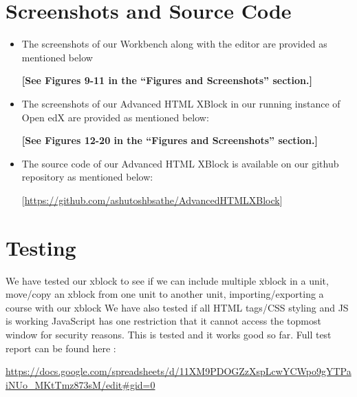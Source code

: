 \section{Screenshots and Source Code}
\begin{itemize}
\item The screenshots of our Workbench along with the editor are provided as mentioned below
\begin{center}\textbf{[See Figures 9-11 in the “Figures and Screenshots” section.]}\end{center}
\item The screenshots of our Advanced HTML XBlock in our running instance of Open edX are
provided as mentioned below:
\begin{center}\textbf{[See Figures 12-20 in the “Figures and Screenshots” section.]}\end{center}
\item The source code of our Advanced HTML XBlock is available on our github repository as
mentioned below:\newline
\begin{center}[\url{https://github.com/ashutoshbsathe/AdvancedHTMLXBlock}]\end{center}
\end{itemize}

\section{Testing} 
We have tested our xblock to see if we can include multiple xblock in a unit, move/copy an xblock from one unit to another unit, importing/exporting a course with our xblock \newline
We have also tested if all HTML tags/CSS styling and JS is working \newline 
JavaScript has one restriction that it cannot access the topmost window for security reasons. This is tested and it works good so far. \newline\newline
Full test report can be found here : \newline 
\begin{small}
\url{https://docs.google.com/spreadsheets/d/11XM9PDOGZzXspLcwYCWpo9gYTPaiNUo_MKtTmz873sM/edit#gid=0}
\end{small}


